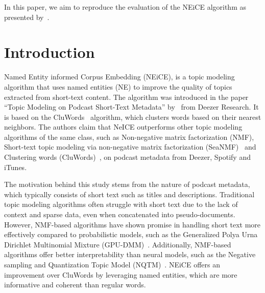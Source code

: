 \documentclass[manuscript]{acmart}
\begin{document}


\maketitle

In this paper, we aim to reproduce the evaluation of the NEiCE algorithm as presented by~\citet{valero2022topic}.

\section{Introduction}

Named Entity informed Corpus Embedding (NEiCE), is a topic modeling algorithm that uses named entities (NE) to improve the quality of topics extracted from short-text content. The algorithm was introduced in the paper ``Topic Modeling on Podcast Short-Text Metadata'' by~\citet{valero2022topic} from Deezer Research. It is based on the CluWords~\cite{10.1145/3289600.3291032} algorithm, which clusters words based on their nearest neighbors. The authors claim that NeICE outperforms other topic modeling algorithms of the same class, such as Non-negative matrix factorization (NMF), Short-text topic modeling via non-negative matrix factorization (SeaNMF)~\cite{shi2018short} and Clustering words (CluWords)~\cite{10.1145/3289600.3291032}, on podcast metadata from Deezer, Spotify and iTunes.

The motivation behind this study stems from the nature of podcast metadata, which typically consists of short text such as titles and descriptions. Traditional topic modeling algorithms often struggle with short text due to the lack of context and sparse data, even when concatenated into pseudo-documents. However, NMF-based algorithms have shown promise in handling short text more effectively compared to probabilistic models, such as the Generalized Polya Urna Dirichlet Multinomial Mixture (GPU-DMM)~\cite{10.1145/2911451.2911499}. Additionally, NMF-based algorithms offer better interpretability than neural models, such as the Negative sampling and Quantization Topic Model (NQTM)~\cite{wu2020short}. NEiCE offers an improvement over CluWords by leveraging named entities, which are more informative and coherent than regular words.
\end{document}
